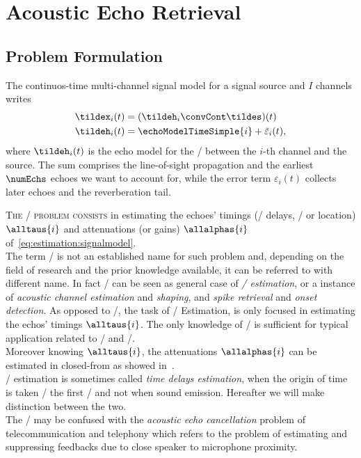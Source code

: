 \chapter{Acoustic Echo Retrieval}\label{ch:estimation}
\vspace{-2.5em}
\synopsisChEstimation

\section{Problem Formulation}\label{sec:estimation:problem}
The continuos-time multi-channel signal model for a signal source and $I$ channels writes
\begin{equation}\label{eq:estimation:signalmodel}
    \begin{aligned}
        \tildex_i(t) &= (\tildeh_i \convCont \tildes)(t) \\
        \tildeh_i(t) &= \echoModelTimeSimple{i} + \tilde{\varepsilon}_i(t),
    \end{aligned}
\end{equation}
where $\tildeh_i(t)$ is the echo model for the \RIR/ between the $i$-th channel and the source.
The sum comprises the line-of-sight propagation and the earliest $\numEchs$ echoes we want to account for, while the error term $\varepsilon_i(t)$ collects later echoes and the reverberation tail.

\mynewline
\textsc{The \AERdef/ problem consists} in estimating the echoes' timings (\aka/ delays, \TOAdef/ or location) $\alltaus{i}$ and attenuations (or gains) $\allalphas{i}$ of~\cref{eq:estimation:signalmodel}.
\\The term \AER/ is not an established name for such problem and, depending on the field of research and the prior knowledge available, it can be referred to with different name.
In fact \AER/ can be seen as general case of \textit{\TOAs/ estimation}, or a instance of \textit{acoustic channel estimation} and \textit{shaping}, and \textit{spike retrieval} and \textit{onset detection}.
As opposed to \AER/, the task of \TOAs/ Estimation, is only focused in estimating the echos' timings $\alltaus{i}$.
The only knowledge of \TOAs/ is sufficient for typical application related to \SSL/ and \RooGE/.
\\Moreover knowing $\alltaus{i}$, the attenuations $\allalphas{i}$ can be estimated in closed-from as showed in~.
\\\TOAs/ estimation is sometimes called \textit{time delays estimation}, when the origin of time is taken \wrt/ the first \TOA/ and not when sound emission.
Hereafter we will make distinction between the two.
\\The \AER/ may be confused with the \textit{acoustic echo cancellation} problem of telecommunication and telephony which refers to the problem of estimating and suppressing feedbacks due to close speaker to microphone proximity.


